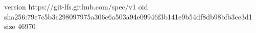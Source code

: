 version https://git-lfs.github.com/spec/v1
oid sha256:79e7c5b3c298097975a306c6a503a94e09946f3b141e9b54df8db98bfb3ce3d1
size 46970
